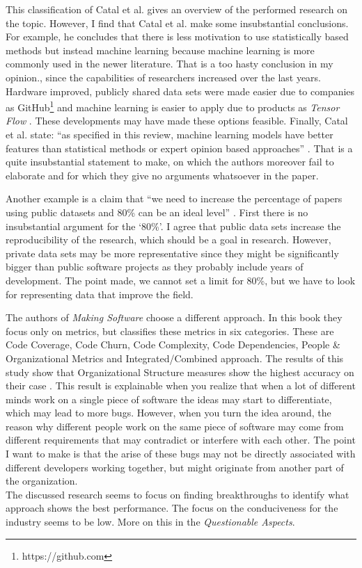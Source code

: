 This classification of Catal et al. gives an overview of the performed research on the topic.
However, I find that Catal et al. make some insubstantial conclusions.
For example, he concludes that there is less motivation to use statistically based methods but instead machine learning \autocite[7350]{Catal20097346} because machine learning is more commonly used in the newer literature.
That is a too hasty conclusion in my opinion., since the capabilities of researchers increased over the last years.
Hardware improved, publicly shared data sets were made easier due to companies as GitHub\footnote{https://github.com}
and machine learning is easier to apply due to products as \textit{Tensor Flow} \autocite{abaditensorflow}.
These developments may have made these options feasible.
Finally, Catal et al. state: ``as specified in this review, machine learning models have better features than statistical methods or expert opinion based approaches'' \autocite[7351]{Catal20097346}.
That is a quite insubstantial statement to make, on which the authors moreover fail to elaborate and for which they give no arguments whatsoever in the paper.

Another example is a claim that ``we need to increase the percentage of papers using public datasets and 80\% can be an ideal level'' \autocite[7351]{Catal20097346}.
First there is no insubstantial argument for the `80\%'. I agree that public data sets increase the reproducibility of the research, which should be a goal in research.
However, private data sets may be more representative since they might be significantly bigger than public software projects as they probably include years of development.
The point made, we cannot set a limit for 80\%, but we have to look for representing data that improve the field.

The authors of \textit{Making Software} \autocite{MAKING_SOFTWARE} choose a different approach. In this book they focus only on metrics, but classifies these metrics in six categories.
These are Code Coverage, Code Churn, Code Complexity, Code Dependencies, People \& Organizational Metrics and Integrated/Combined approach.
The results of this study show that Organizational Structure measures show the highest accuracy on their case \autocite[430]{MAKING_SOFTWARE}.
This result is explainable when you realize that when a lot of different minds work on a single piece of software the ideas may start to differentiate, which may lead to more bugs.
However, when you turn the idea around, the reason why different people work on the same piece of software may come from different requirements that may contradict or interfere with each other.
The point I want to make is that the arise of these bugs may not be directly associated with different developers working together, but might originate from another part of the organization.
\\
The discussed research seems to focus on finding breakthroughs to identify what approach shows the best performance.
The focus on the conduciveness for the industry seems to be low. More on this in the \textit{Questionable Aspects}.

